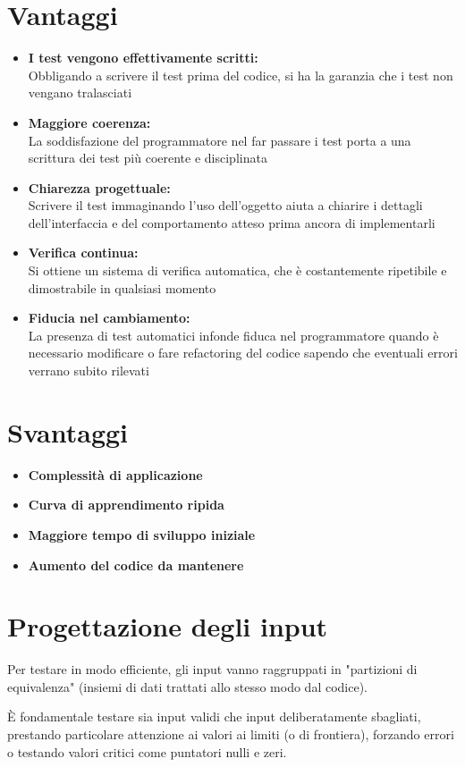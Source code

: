 \section{Vantaggi}
\begin{itemize}
    \item \textbf{I test vengono effettivamente scritti:}\\ Obbligando a scrivere il test prima del codice, si ha la garanzia che i test non vengano tralasciati
    \item \textbf{Maggiore coerenza:}\\ La soddisfazione del programmatore nel far passare i test porta a una scrittura dei test più coerente e disciplinata
    \item \textbf{Chiarezza progettuale:}\\ Scrivere il test immaginando l'uso dell'oggetto aiuta a chiarire i dettagli dell'interfaccia e del comportamento atteso prima ancora di implementarli
    \item \textbf{Verifica continua:}\\ Si ottiene un sistema di verifica automatica, che è costantemente ripetibile e dimostrabile in qualsiasi momento
    \item \textbf{Fiducia nel cambiamento:}\\ La presenza di test automatici infonde fiduca nel programmatore quando è necessario modificare o fare refactoring del codice sapendo che eventuali errori verrano subito rilevati
\end{itemize}

\section{Svantaggi}
\begin{itemize}
    \item \textbf{Complessità di applicazione}
    \item \textbf{Curva di apprendimento ripida}
    \item \textbf{Maggiore tempo di sviluppo iniziale}
    \item \textbf{Aumento del codice da mantenere}
\end{itemize}

\section{Progettazione degli input}
Per testare in modo efficiente, gli input vanno raggruppati in "partizioni di equivalenza" (insiemi di dati trattati allo stesso modo dal codice). 

È fondamentale testare sia input validi che input deliberatamente sbagliati, prestando particolare attenzione ai valori ai limiti (o di frontiera), forzando errori o testando valori critici come puntatori nulli e zeri.
